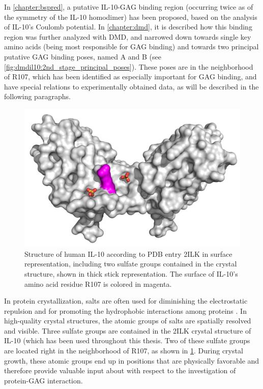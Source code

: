 In \cref{chapter:bspred}, a putative IL-10-GAG binding region (occurring twice
as of the symmetry of the IL-10 homodimer) has been proposed, based on the
analysis of IL-10's Coulomb potential. In \cref{chapter:dmd}, it is described
how this binding region was further analyzed with DMD, and narrowed down towards
single key amino acids (being most responsible for GAG binding) and towards two
principal putative GAG binding poses, named A and B (see
\cref{fig:dmdil10:2nd_stage_principal_poses}). These poses are in the
neighborhood of R107, which has been identified as especially important for GAG
binding, and have special relations to experimentally obtained data, as will be
described in the following paragraphs.

\begin{figure}
\centering
\includegraphics[width=1.0\textwidth]{gfx/together/il10sulfates_01.jpg}
\caption[]{
Structure of human IL-10 according to PDB entry 2ILK in surface representation,
including two sulfate groups contained in the crystal structure, shown in thick
stick representation. The surface of IL-10's amino acid residue R107 is colored
in magenta. }
\label{fig:together:il10sulfates}
\end{figure}

In protein crystallization, salts are often used for diminishing the
electrostatic repulsion and for promoting the hydrophobic interactions among
proteins \cite{crystal_salts_2001}. In high-quality crystal structures, the
atomic groups of salts are spatially resolved and visible. Three sulfate groups
are contained in the 2ILK crystal structure of IL-10 (which has been used
throughout this thesis. Two of these sulfate groups are located right in the
neighborhood of R107, as shown in \cref{fig:together:il10sulfates}. During
crystal growth, these atomic groups end up in positions that are physically
favorable and therefore provide valuable input about with respect to the
investigation of protein-GAG interaction.


